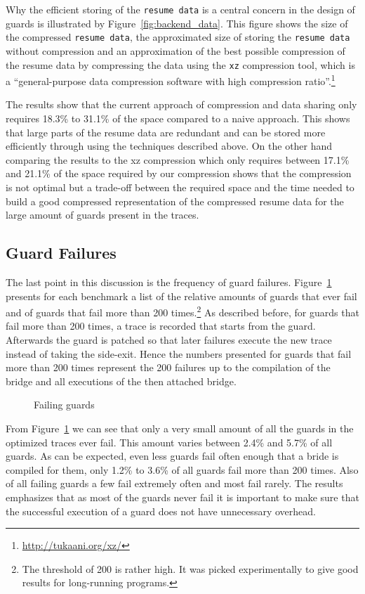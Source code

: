 \documentclass[10pt,preprint]{sigplanconf}
\begin{document}
Why the efficient storing of the \texttt{resume data} is a central concern in the design
of guards is illustrated by Figure~\ref{fig:backend_data}. This figure shows
the size of the compressed \texttt{resume data}, the approximated size of
storing the \texttt{resume data} without compression and
an approximation of the best possible compression of the resume data by
compressing the data using the
\texttt{xz} compression tool, which is a ``general-purpose data compression
software with high compression ratio''.\footnote{\url{http://tukaani.org/xz/}}

The results show that the current approach of compression and data sharing only
requires 18.3\% to 31.1\% of the space compared to a naive approach. This
shows that large parts of the resume data are redundant and can be stored more
efficiently through using the techniques described above. On the other hand
comparing the results to the xz compression which only requires between 17.1\%
and 21.1\% of the space required by our compression shows that the compression
is not optimal but a trade-off between the required space and the time needed
to build a good compressed representation of the compressed resume data for the
large amount of guards present in the traces.

\subsection{Guard Failures}
\label{sub:guard_failure}
The last point in this discussion is the frequency of guard failures.
Figure~\ref{fig:failing_guards} presents for each benchmark a list of the
relative amounts of guards that ever fail and of guards that fail more than 200
times.\footnote{
    The threshold of 200 is rather high. It was picked experimentally to give
    good results for long-running programs.
}
As described before, for guards that fail more than 200 times, a trace
is recorded that starts from the guard. Afterwards the guard is patched so that later
failures execute the new trace instead of taking the side-exit. Hence the
numbers presented for guards that fail more than 200 times represent the 200
failures up to the compilation of the bridge and all executions of the then
attached bridge.

\begin{figure}
    
    \caption{Failing guards}
    \label{fig:failing_guards}
\end{figure}

From Figure~\ref{fig:failing_guards} we can see that only a very small amount
of all the guards in the optimized traces ever fail. This amount varies between
2.4\% and 5.7\% of all guards. As can be expected, even less guards fail often
enough that a bride is compiled for them, only 1.2\% to 3.6\% of all guards
fail more than 200 times. Also of all failing guards a few fail extremely often
and most fail rarely. The results emphasizes that as most of the guards never
fail it is important to make sure that the successful execution of a guard does
not have unnecessary overhead.
\end{document}
